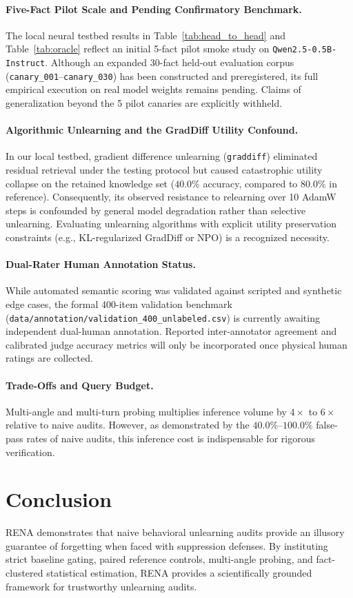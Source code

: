 \documentclass[11pt,a4paper]{article}
\begin{document}
\paragraph{Five-Fact Pilot Scale and Pending Confirmatory Benchmark.}
The local neural testbed results in Table~\ref{tab:head_to_head} and Table~\ref{tab:oracle} reflect an initial 5-fact pilot smoke study on \texttt{Qwen2.5-0.5B-Instruct}. Although an expanded 30-fact held-out evaluation corpus (\texttt{canary\_001}--\texttt{canary\_030}) has been constructed and preregistered, its full empirical execution on real model weights remains pending. Claims of generalization beyond the 5 pilot canaries are explicitly withheld.

\paragraph{Algorithmic Unlearning and the GradDiff Utility Confound.}
In our local testbed, gradient difference unlearning (\texttt{graddiff}) eliminated residual retrieval under the testing protocol but caused catastrophic utility collapse on the retained knowledge set ($40.0\%$ accuracy, compared to $80.0\%$ in reference). Consequently, its observed resistance to relearning over 10 AdamW steps is confounded by general model degradation rather than selective unlearning. Evaluating unlearning algorithms with explicit utility preservation constraints (e.g., KL-regularized GradDiff or NPO) is a recognized necessity.

\paragraph{Dual-Rater Human Annotation Status.}
While automated semantic scoring was validated against scripted and synthetic edge cases, the formal 400-item validation benchmark (\texttt{data/annotation/validation\_400\_unlabeled.csv}) is currently awaiting independent dual-human annotation. Reported inter-annotator agreement and calibrated judge accuracy metrics will only be incorporated once physical human ratings are collected.

\paragraph{Trade-Offs and Query Budget.}
Multi-angle and multi-turn probing multiplies inference volume by $4\times$ to $6\times$ relative to naive audits. However, as demonstrated by the $40.0\%$--$100.0\%$ false-pass rates of naive audits, this inference cost is indispensable for rigorous verification.

\section{Conclusion}
RENA demonstrates that naive behavioral unlearning audits provide an illusory guarantee of forgetting when faced with suppression defenses. By instituting strict baseline gating, paired reference controls, multi-angle probing, and fact-clustered statistical estimation, RENA provides a scientifically grounded framework for trustworthy unlearning audits.



\end{document}
